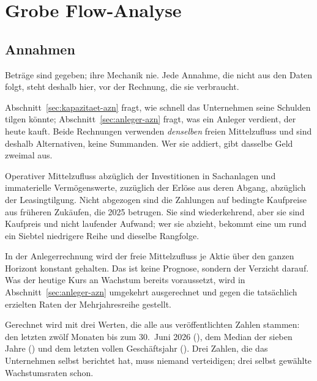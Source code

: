 \section{Grobe Flow-Analyse}
\label{sec:flow-azn}

\subsection{Annahmen}
\label{sec:annahmen-azn}

Betr\"age sind gegeben; ihre Mechanik nie. Jede Annahme, die nicht aus den
Daten folgt, steht deshalb hier, vor der Rechnung, die sie verbraucht.

 Abschnitt~\ref{sec:kapazitaet-azn}
fragt, wie schnell das Unternehmen seine Schulden tilgen k\"onnte;
Abschnitt~\ref{sec:anleger-azn} fragt, was ein Anleger verdient, der heute
kauft. Beide Rechnungen verwenden \emph{denselben} freien Mittelzufluss und
sind deshalb Alternativen, keine Summanden. Wer sie addiert, gibt dasselbe
Geld zweimal aus.

 Operativer Mittelzufluss abz\"uglich der
Investitionen in Sachanlagen und immaterielle Verm\"ogenswerte, zuz\"uglich der
Erl\"ose aus deren Abgang, abz\"uglich der Leasingtilgung. Nicht abgezogen
sind die Zahlungen auf bedingte Kaufpreise aus fr\"uheren Zuk\"aufen, die 2025
\MioUSD{\AznBedingteKaufpreise} betrugen.
Sie sind wiederkehrend, aber sie sind Kaufpreis und nicht laufender Aufwand;
wer sie abzieht, bekommt eine um rund ein Siebtel niedrigere Reihe und
dieselbe Rangfolge.

 In der Anlegerrechnung wird der
freie Mittelzufluss je Aktie \"uber den ganzen Horizont konstant gehalten. Das
ist keine Prognose, sondern der Verzicht darauf. Was der heutige Kurs an
Wachstum bereits voraussetzt, wird in Abschnitt~\ref{sec:anleger-azn}
umgekehrt ausgerechnet und gegen die tats\"achlich erzielten Raten der
Mehrjahresreihe gestellt.

 Gerechnet wird mit drei
Werten, die alle aus ver\"offentlichten Zahlen stammen: den letzten zw\"olf
Monaten bis zum 30.~Juni 2026 (\USDje{\AznFcfLtm}), dem Median der sieben
Jahre (\USDje{\AznFcfMedian}) und dem letzten vollen Gesch\"aftsjahr
(\USDje{\AznFcfVoll}). Drei Zahlen, die das Unternehmen selbst berichtet hat,
muss niemand verteidigen; drei selbst gew\"ahlte Wachstumsraten schon.

